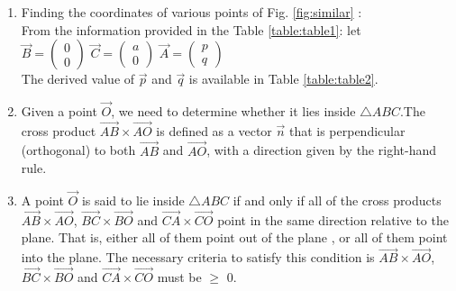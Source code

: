 \begin{enumerate}

\item
Finding the coordinates of various points of Fig. \ref{fig:similar} :\\
From the information provided in the Table \ref{table:table1}: let\\
    \quad $ \vec{B}= \begin{pmatrix}0\\0\end{pmatrix}$
    \quad $\vec{C}=\begin{pmatrix}a\\0\end{pmatrix}$
    \quad $\vec{A}=\begin{pmatrix}p\\q\end{pmatrix}$\\The derived value of $\vec{p}$ and $\vec{q}$ is available in Table \ref{table:table2}.
\item Given a point $\vec{O}$, we need to determine whether it lies inside $\triangle ABC$.The cross product $\vec{AB} \times \vec{AO}$ is defined as a vector $\vec{n}$ that is perpendicular (orthogonal) to both $\vec{AB}$ and $\vec{AO}$, with a direction given by the right-hand rule. 
      
\item A point $\vec{O}$ is said to lie inside $\triangle ABC$ if and only if all of the cross products $\vec{AB} \times \vec{AO}$, $\vec{BC} \times \vec{BO}$  and $\vec{CA} \times \vec{CO}$ point in the same direction relative to the plane. That is, either all of them point out of the plane , or all of them point into the plane. The necessary criteria to satisfy this condition is $\vec{AB} \times \vec{AO}$, $\vec{BC} \times \vec{BO}$  and $\vec{CA} \times \vec{CO}$ must be $\geqslant$ 0.
      
      

\end{enumerate}
